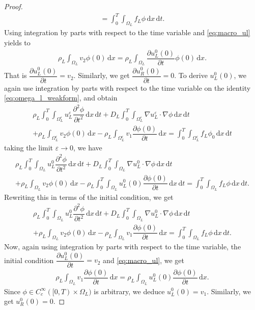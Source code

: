 \documentclass[11pt]{article}
\def\es{\varepsilon}
\def\oll{\Omega_L^\varepsilon}
\newcommand{\di}[1]{\,\mathrm{d}#1}
\begin{document}
\begin{proof}
\begin{align*}
    = \int_0^T\int_{\Omega_L} f_L\phi\di{x}\di{t}.
\end{align*}
Using integration by parts with respect to the time variable and \eqref{eq:macro_ul} yields to
\begin{align*}
    \rho_L\int_{\Omega_L}  v_2  \phi(0) \di{x}= \rho_L\int_{\Omega_L}\dfrac{\partial u_L^0(0)}{\partial t} \phi(0) \di{x}.
\end{align*}
That is $\dfrac{\partial u_L^0(0)}{\partial t}=v_2$. Similarly, we get  $\dfrac{\partial u_R^0(0)}{\partial t}=0$. To derive $u_L^0(0)$, we again use integration by parts with respect to the time variable on the identity \eqref{eq:omega_l_weakform}, and obtain
\begin{multline*}
    \rho_L\int_0^T\int_{\oll}  u_L^\es \dfrac{\partial^2 \phi}{\partial t^2} \di{x}\di{t}
    +D_L\int_0^T\int_{\oll}\nabla u_L^\es \cdot \nabla \phi  \di{x}\di{t} \\+\rho_L\int_{\oll}  v_2  \phi(0)\di{x}-\rho_L\int_{\oll}  v_1  \dfrac{\partial \phi(0)}{\partial t}\di{x}
    = \int_0^T\int_{\oll} f_L\phi_0 \di{x}\di{t}
\end{multline*}
taking the limit $\es\rightarrow 0$, we have
\begin{multline*}
     \rho_L\int_0^T\int_{\Omega_L}   u_L^0 \dfrac{\partial^2 \phi}{\partial t^2} \di{x}\di{t}
    +D_L\int_0^T\int_{\Omega_L}\nabla u_L^0 \cdot \nabla \phi  \di{x}\di{t} \\+\rho_L\int_{\Omega_L}  v_2  \phi(0) \di{x}-\rho_L\int_0^T\int_{\Omega_L}  u_L^0(0) \dfrac{\partial \phi(0)}{\partial t} \di{x}\di{t}
    = \int_0^T\int_{\Omega_L} f_L\phi \di{x}\di{t}.
\end{multline*}
Rewriting this in terms of the initial condition, we get
\begin{multline*}
     \rho_L\int_0^T\int_{\Omega_L}   u_L^0 \dfrac{\partial^2 \phi}{\partial t^2} \di{x}\di{t}
    +D_L\int_0^T\int_{\Omega_L}\nabla u_L^0 \cdot \nabla \phi  \di{x}\di{t} \\+\rho_L\int_{\Omega_L}  v_2  \phi(0) \di{x}-\rho_L\int_{\Omega_L}  v_1 \dfrac{\partial \phi(0)}{\partial t} \di{x}
    = \int_0^T\int_{\Omega_L} f_L\phi \di{x}\di{t}.
\end{multline*}
Now, again using integration by parts with respect to the time variable, the initial condition $\dfrac{\partial u_L^0(0)}{\partial t}=v_2$  and \eqref{eq:macro_ul}, we get
\begin{align*}
    \rho_L\int_{\Omega_L}  v_1 \dfrac{\partial \phi(0)}{\partial t} \di{x}=\rho_L\int_{\Omega_L}  u_L^0(0) \dfrac{\partial \phi(0)}{\partial t} \di{x}.
\end{align*}
Since $\phi\in C_c^\infty([0,T)\times \Omega_L)$ is arbitrary, we deduce $u_L^0(0)=v_1$. Similarly, we get $u_R^0(0)=0$. 


\end{proof}
\end{document}
